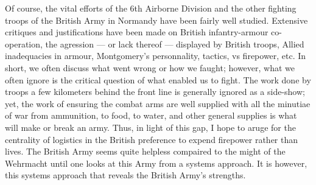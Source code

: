 \documentclass[noraggedright]{turabian-researchpaper}
\begin{document}




Of course, the vital efforts of the 6th Airborne Division and the other 
fighting troops of the British Army in Normandy have been fairly well studied.
Extensive critiques and justifications have been made on British 
infantry-armour co-operation, the agression --- or lack thereof --- displayed
by British troops, Allied inadequacies in armour, Montgomery's personnality,
tactics, vs firepower, etc.  In short, we often discuss what went wrong or 
how we faught; however, what we often ignore is the critical question of what
enabled us to fight. The work done by troops a few kilometers behind the front 
line is generally ignored as a side-show; yet, the work of ensuring the combat 
arms are well supplied with all the minutiae of war from ammunition, to food, 
to water, and other general supplies is what will make or break an army. Thus,
in light of this gap, I hope to aruge for the centrality of logistics in the
British preference to expend firepower rather than lives.  The British Army
seems quite helpless compaired to the might of the Wehrmacht until one looks
at this Army from a systems approach.  It is however, this systems approach
that reveals the British Army's strengths.  %

\end{document}
